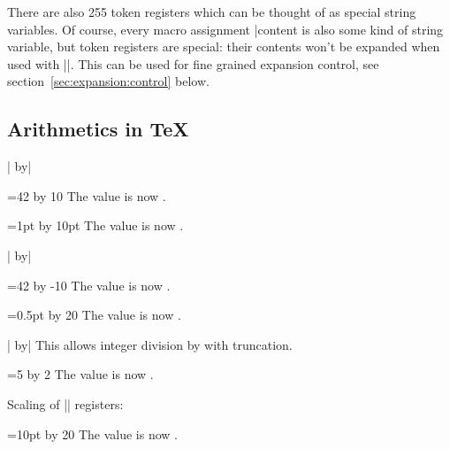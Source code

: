 \begin{command}{\toks{}}
	There are also 255 token registers which can be thought of as special string variables. Of course, every macro assignment |\def\macro|\marg{content} is also some kind of string variable, but token registers are special: their contents won't be expanded when used with |\the\toks|. This can be used for fine grained expansion control, see section~\ref{sec:expansion:control} below.
\end{command}

\subsection{Arithmetics in \TeX}
\begin{command}{\advance{}| by|}
\begin{codeexample}[]
=42
\advance{} by 10
The value is now \the{}.
\end{codeexample}

\begin{codeexample}[]
=1pt
\advance{} by 10pt
The value is now \the{}.
\end{codeexample}
\end{command}

\begin{command}{\multiply{}| by|}
\begin{codeexample}[]
=42
\multiply{} by -10
The value is now \the{}.
\end{codeexample}

\begin{codeexample}[]
=0.5pt
\multiply{} by 20
The value is now \the{}.
\end{codeexample}
\end{command}

\begin{command}{\divide{}| by|}
	This allows integer division by  with truncation.
\begin{codeexample}[]
=5
\divide{} by 2
The value is now \the{}.
\end{codeexample}

	Scaling of |\dimen| registers:
\begin{codeexample}[]
=10pt
\divide{} by 20
The value is now \the{}.
\end{codeexample}
\end{command}

